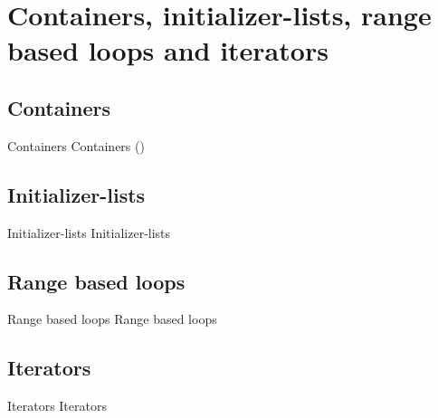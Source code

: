 \section{Containers, initializer-lists, range based loops and iterators}
\subsection{Containers}

\begin{frame}{Containers}
Containers (\cite[][{[tag.id]}]{CPP})
\end{frame}

\subsection{Initializer-lists}

\begin{frame}{Initializer-lists}
Initializer-lists
\end{frame}

\subsection{Range based loops}

\begin{frame}{Range based loops}
Range based loops
\end{frame}

\subsection{Iterators}

\begin{frame}{Iterators}
Iterators
\end{frame}
